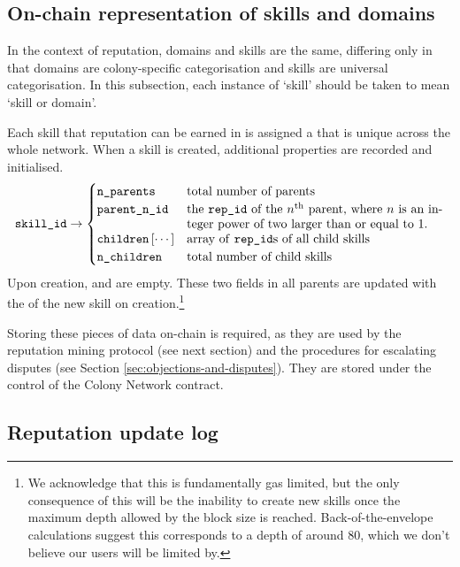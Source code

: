 \subsection{On-chain representation of skills and domains}\label{subsec:on-chain-representation-of-skills}
In the context of reputation, domains and skills are the same, differing only in that domains are colony-specific categorisation and skills are universal categorisation. In this subsection, each instance of `skill' should be taken to mean `skill or domain'.

Each skill that reputation can be earned in is assigned a  that is unique across the whole network. When a skill is created, additional properties are recorded and initialised.
\begin{equation*}
  \ascode{skill\_id} \rightarrow 
  \begin{cases}
    \ascode{n\_parents} &	\textnormal{total number of parents}\\
    \ascode{parent\_n\_id} &	\parbox[t]{.6\linewidth}{\textnormal{the \ascode{rep\_id} of the $n^{\rm th}$ parent, where $n$ is an integer power of two larger than or equal to 1. }}\\
    \ascode{children}\left[\cdots\right] &	\textnormal{array of \ascode{rep\_id}s of all child skills}\\
    \ascode{n\_children} &	\textnormal{total number of child skills}
  \end{cases}
\end{equation*}
Upon creation,  and  are empty. These two fields in all parents are updated with the  of the new skill on creation.\footnote{We acknowledge that this is fundamentally gas limited, but the only consequence of this will be the inability to create new skills once the maximum depth allowed by the block size is reached. Back-of-the-envelope calculations suggest this corresponds to a depth of around 80, which we don't believe our users will be limited by.}

Storing these pieces of data on-chain is required, as they are used by the reputation mining protocol (see next section) and the procedures for escalating disputes (see Section \ref{sec:objections-and-disputes}). They are stored under the control of the Colony Network contract.

\subsection{Reputation update log}\label{subsec:reputation-update-log}

